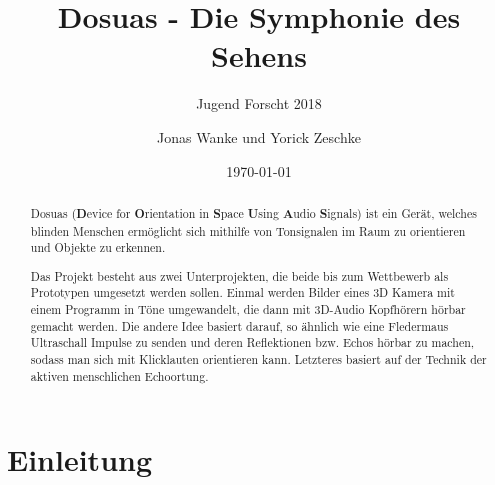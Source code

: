 \documentclass[a4paper,12pt,ngerman]{scrartcl}
\title{Dosuas - Die Symphonie des Sehens}
\subtitle{Jugend Forscht 2018}
\author{Jonas Wanke und Yorick Zeschke}
\date{\today}
\begin{document}
\maketitle

\begin{abstract}
Dosuas (\textbf{D}evice for \textbf{O}rientation in \textbf{S}pace \textbf{U}sing 
\textbf{A}udio \textbf{S}ignals) ist ein Gerät, welches blinden Menschen ermöglicht
sich mithilfe von Tonsignalen im Raum zu orientieren und Objekte zu erkennen.\par
Das Projekt besteht aus zwei Unterprojekten, die beide bis zum 
Wettbewerb als Prototypen umgesetzt werden sollen. Einmal werden Bilder eines 3D Kamera
mit einem Programm in Töne umgewandelt, die dann mit 3D-Audio Kopfhörern hörbar gemacht
werden. Die andere Idee basiert darauf, so ähnlich wie eine Fledermaus Ultraschall 
Impulse zu senden und deren Reflektionen bzw. Echos hörbar zu machen, sodass man
sich mit Klicklauten orientieren kann. Letzteres basiert auf der Technik der aktiven
menschlichen Echoortung.
\end{abstract}

\tableofcontents

\newpage

\section{Einleitung}
\end{document}

